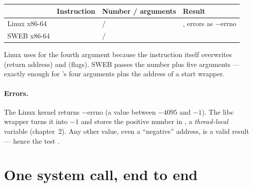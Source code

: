 \begin{center}
\begin{tabular}{L{2.4cm}L{3.2cm}L{4.4cm}L{3.2cm}}
\toprule
 & \textbf{Instruction} & \textbf{Number / arguments} & \textbf{Result} \\
\midrule
Linux x86-64 &  &  / 
& , errors as $-$errno \\
SWEB x86-64 &  &  / 
&  \\
\bottomrule
\end{tabular}
\end{center}

Linux uses  for the fourth argument because the 
instruction itself overwrites  (return address) and 
(flags). SWEB passes the number plus five arguments --- exactly enough for
's four arguments plus the address of a start
wrapper.

\paragraph{Errors.} The Linux kernel returns $-$errno (a value between
$-4095$ and $-1$). The libc wrapper turns it into $-1$ and stores the
positive number in , a \emph{thread-local} variable
(chapter~2). Any other value, even a ``negative'' address, is a valid
result --- hence the test .

\section{One system call, end to end}

